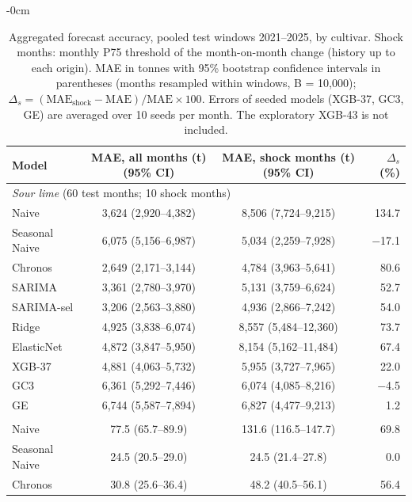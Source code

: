 \begin{table}[htbp]
\centering
\footnotesize
\setlength{\tabcolsep}{4pt}
\caption{Aggregated forecast accuracy, pooled test windows 2021--2025, by cultivar. Shock months: monthly P75 threshold of the month-on-month change (history up to each origin). MAE in tonnes with 95\% bootstrap confidence intervals \cite{efron1993bootstrap} in parentheses (months resampled within windows, B = 10,000); $\Delta_s = (\mathrm{MAE}_{\mathrm{shock}} - \mathrm{MAE})/\mathrm{MAE} \times 100$. Errors of seeded models (XGB-37, GC3, GE) are averaged over 10 seeds per month. The exploratory XGB-43 is not included.}
\label{tab:main_aggregate_accuracy}
\begin{adjustwidth}{-\extralength}{0cm}
\centering
\begin{tabular}{lccr}
\toprule
Model & MAE, all months (t) (95\% CI) & MAE, shock months (t) (95\% CI) & $\Delta_s$ (\%) \\
\midrule
\multicolumn{4}{l}{\textit{Sour lime} (60 test months; 10 shock months)} \\
Naive & 3,624 (2,920--4,382) & 8,506 (7,724--9,215) & 134.7 \\
Seasonal Naive & 6,075 (5,156--6,987) & 5,034 (2,259--7,928) & $-$17.1 \\
Chronos & 2,649 (2,171--3,144) & 4,784 (3,963--5,641) & 80.6 \\
SARIMA & 3,361 (2,780--3,970) & 5,131 (3,759--6,624) & 52.7 \\
SARIMA-sel & 3,206 (2,563--3,880) & 4,936 (2,866--7,242) & 54.0 \\
Ridge & 4,925 (3,838--6,074) & 8,557 (5,484--12,360) & 73.7 \\
ElasticNet & 4,872 (3,847--5,950) & 8,154 (5,162--11,484) & 67.4 \\
XGB-37 & 4,881 (4,063--5,732) & 5,955 (3,727--7,965) & 22.0 \\
GC3 & 6,361 (5,292--7,446) & 6,074 (4,085--8,216) & $-$4.5 \\
GE & 6,744 (5,587--7,894) & 6,827 (4,477--9,213) & 1.2 \\
\addlinespace
\multicolumn{4}{l}{\textit{Sweet lime} (60 test months; 15 shock months)} \\
Naive & 77.5 (65.7--89.9) & 131.6 (116.5--147.7) & 69.8 \\
Seasonal Naive & 24.5 (20.5--29.0) & 24.5 (21.4--27.8) & 0.0 \\
Chronos & 30.8 (25.6--36.4) & 48.2 (40.5--56.1) & 56.4 \\

\end{tabular}
\end{adjustwidth}
\end{table}
